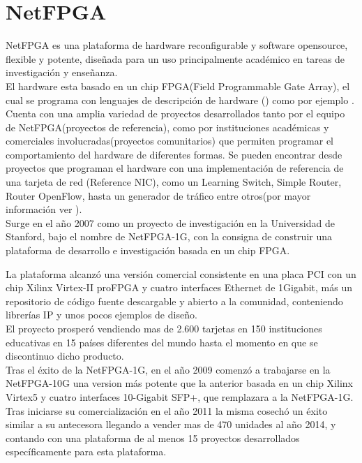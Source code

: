 \section{NetFPGA}
\label{section2.9}

NetFPGA\cite{NetFPGA1} es una plataforma de hardware reconfigurable y software opensource, flexible y potente, diseñada para un uso principalmente académico en tareas de investigación y enseñanza.\\

El hardware esta basado en un chip FPGA(Field Programmable Gate Array), el cual se programa con lenguajes de descripci\'on de hardware () como por ejemplo . Cuenta con una amplia variedad de proyectos desarrollados tanto por el equipo de NetFPGA(proyectos de referencia), como por instituciones académicas y comerciales involucradas(proyectos comunitarios) que permiten programar el comportamiento del hardware  de diferentes formas. Se pueden encontrar desde proyectos que programan el hardware con una implementación de referencia de una tarjeta de red (Reference NIC), como un Learning Switch, Simple Router, Router OpenFlow, hasta un generador de tr\'afico entre otros(por mayor informaci\'on ver \citep{NetFPGA2}).\\ 

Surge en el año 2007 como un proyecto de investigación en la Universidad de Stanford, bajo el nombre de NetFPGA-1G, con la consigna de construir una plataforma de desarrollo e investigación basada en un chip FPGA.
 
La plataforma alcanz\'o una versi\'on comercial consistente en una placa PCI con un chip Xilinx Virtex-II proFPGA y cuatro interfaces Ethernet de 1Gigabit, m\'as un repositorio de código fuente descargable y abierto a la comunidad, conteniendo librerías IP y unos pocos ejemplos de diseño.\\

El proyecto prosper\'o vendiendo mas de 2.600 tarjetas en 150 instituciones educativas en 15 países diferentes del mundo hasta el momento en que se discontinuo dicho producto.\\

Tras el éxito de la NetFPGA-1G, en el año 2009 comenzó a trabajarse en la NetFPGA-10G una version m\'as potente que la  anterior basada en un chip Xilinx Virtex5 y cuatro interfaces 10-Gigabit SFP+, que remplazara a la NetFPGA-1G. Tras iniciarse su comercialización en el año 2011 la misma cosech\'o un éxito similar a su antecesora llegando a vender mas de 470 unidades al año 2014, y contando con una plataforma de al menos 15 proyectos desarrollados específicamente para esta plataforma.\\

